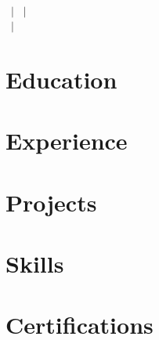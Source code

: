 \documentclass[letterpaper,10pt]{article}
\begin{document}
\begin{center}
  {\Large\bfseries \cvName}\\[2pt]
  \cvLocation\ $|$ \cvPhone\ $|$ \href{mailto:\cvEmail}{\cvEmail}\\
  \href{\cvGithubUrl}{\cvGithub}\ $|$ \href{\cvPortfolioUrl}{\cvPortfolio}
\end{center}

\section{Education}      \cvEducation
\section{Experience}     \cvExperience
\section{Projects}       \cvProjects
\section{Skills}         \cvSkills
\section{Certifications} \cvCerts
\end{document}
